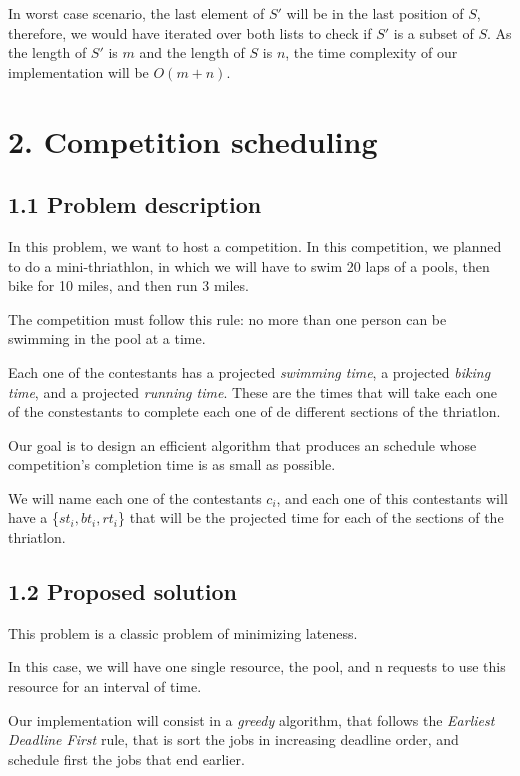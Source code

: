 \documentclass{article}
\begin{document}
In worst case scenario, the last element of $S'$ will be in the last position of $S$, therefore, we would have iterated over both lists to check if $S'$ is a subset of $S$. As the length of $S'$ is $m$ and the length of $S$ is $n$, the time complexity of our implementation will be $O(m+n)$.

\section*{2. Competition scheduling}

\subsection*{1.1 Problem description}

In this problem, we want to host a competition. In this competition, we planned to do a mini-thriathlon, in which we will have to swim 20 laps of a pools, then bike for 10 miles, and then run 3 miles.

The competition must follow this rule:  no more than one person can be swimming in the pool at a time.

Each one of the contestants has a projected \textit{swimming time}, a projected \textit{biking time}, and a projected \textit{running time}. These are the times that will take each one of the constestants to complete each one of de different sections of the thriatlon.

Our goal is to design an efficient algorithm that produces an schedule whose competition's completion time is as small as possible.

We will name each one of the contestants $c_i$, and each one of this contestants will have a \{$st_i,bt_i,rt_i$\} that will be the projected time for each of the sections of the thriatlon.

\subsection*{1.2 Proposed solution}

This problem is a classic problem of minimizing lateness.

In this case, we will have one single resource, the pool, and n requests to use this resource for an interval of time.

Our implementation will consist in a \textit{greedy} algorithm, that follows the \textit{Earliest Deadline First} rule, that is sort the jobs in increasing deadline order, and schedule first the jobs that end earlier.
\end{document}
